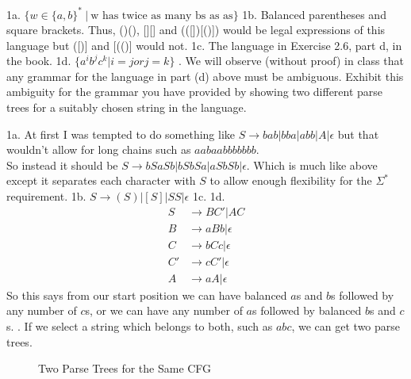 

\usepackage{subfigure}
\usepackage{graphicx}



\homeworkheader{\classnameandsection}

\begin{problem}{1}
  1a. $\{w \in \{a,b\}^*\ |\ \text{w has twice as many bs as as} \}$
  \br
  1b. Balanced parentheses and square brackets. Thus, ()(), [][] and (([])[()]) would be legal expressions of this
     language but ([)] and [(()] would not.
  \br
  1c. The language in Exercise 2.6, part d, in the book.
  \br
  1d. $\{ a^ib^jc^k | i = j or j = k \}$
  . We will observe (without proof) in class that any grammar for the language in part (d) above must be ambiguous.
     Exhibit this ambiguity for the grammar you have provided by showing two different parse trees for a suitably chosen
     string in the language.
  \begin{solution}
    1a. At first I was tempted to do something like $S \rightarrow bab | bba | abb | A | \epsilon$ but that wouldn't
    allow for long chains such as $aabaabbbbbbb$. \\ So instead it should be $S \rightarrow bSaSb | bSbSa |
    aSbSb|\epsilon$. Which is much like above except it separates each character with $S$ to allow enough flexibility
    for the $\Sigma^*$ requirement.
    \br
    1b. $S \rightarrow (S)|[S]|SS|\epsilon$
    \br
    1c.
    \br
    1d.
    \begin{align*}
      S &\rightarrow BC'|AC \\
      B &\rightarrow aBb | \epsilon \\
      C &\rightarrow bCc | \epsilon \\
      C' &\rightarrow cC' | \epsilon \\
      A &\rightarrow aA | \epsilon
    \end{align*}
    So this says from our start position we can have balanced $a$s and $b$s followed by any number of $c$s, or we can
    have any number of $a$s followed by balanced $b$s and $c$s.
    . If we select a string which belongs to both, such as $abc$, we can get two parse trees.
    \begin{figure}[H]
      \centering
      \caption{Two Parse Trees for the Same CFG}
\end{figure}
\end{solution}
\end{problem}
